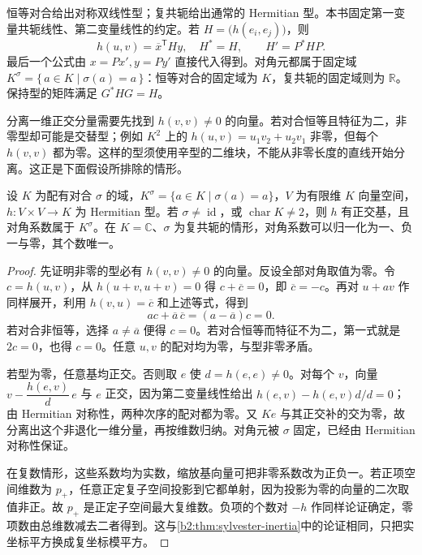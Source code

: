 恒等对合给出对称双线性型；复共轭给出通常的 Hermitian 型。本书固定第一变量共轭线性、第二变量线性的约定。若 \(H=\bigl(h(e_i,e_j)\bigr)\)，则
\[
	h(u,v)=\overline x^{\mathsf T}Hy,\quad H^*=H, \qquad H'=P^*HP.
\]
最后一个公式由 \(x=Px',y=Py'\) 直接代入得到。对角元都属于固定域 \(K^\sigma=\{\,a\in K\mid\sigma(a)=a\,\}\)：恒等对合的固定域为 \(K\)，复共轭的固定域则为 \(\mathbb R\)。保持型的矩阵满足 \(G^*HG=H\)。

\ProseParagraphBreak
分离一维正交分量需要先找到 \(h(v,v)\ne0\) 的向量。若对合恒等且特征为二，非零型却可能是交替型；例如 \(K^2\) 上的 \(h(u,v)=u_1v_2+u_2v_1\) 非零，但每个 \(h(v,v)\) 都为零。这样的型须使用辛型的二维块，不能从非零长度的直线开始分离。这正是下面假设所排除的情形。

\begin{proposition}\label{b2:prop:hermitian-diagonalization}
	设 \(K\) 为配有对合 \(\sigma\) 的域，\(K^\sigma=\{a\in K\mid\sigma(a)=a\}\)，\(V\) 为有限维 \(K\) 向量空间，\(h:V\times V\to K\) 为 Hermitian 型。若 \(\sigma\ne\operatorname{id}\)，或 \(\operatorname{char}K\ne2\)，则 \(h\) 有正交基，且对角系数属于 \(K^\sigma\)。在 \(K=\mathbb C\)、\(\sigma\) 为复共轭的情形，对角系数可以归一化为一、负一与零，其个数唯一。
\end{proposition}
\begin{proof}
	先证明非零的型必有 \(h(v,v)\ne0\) 的向量。反设全部对角取值为零。令 \(c=h(u,v)\)，从 \(h(u+v,u+v)=0\) 得 \(c+\overline c=0\)，即 \(\overline c=-c\)。再对 \(u+av\) 作同样展开，利用 \(h(v,u)=\overline c\) 和上述等式，得到
	\[
		ac+\overline a\,\overline c=(a-\overline a)c=0.
	\]
	若对合非恒等，选择 \(a\ne\overline a\) 便得 \(c=0\)。若对合恒等而特征不为二，第一式就是 \(2c=0\)，也得 \(c=0\)。任意 \(u,v\) 的配对均为零，与型非零矛盾。

	若型为零，任意基均正交。否则取 \(e\) 使 \(d=h(e,e)\ne0\)。对每个 \(v\)，向量 \(v-\dfrac{h(e,v)}d\,e\) 与 \(e\) 正交，因为第二变量线性给出 \(h(e,v)-h(e,v)d/d=0\)；由 Hermitian 对称性，两种次序的配对都为零。又 \(Ke\) 与其正交补的交为零，故分离出这个非退化一维分量，再按维数归纳。对角元被 \(\sigma\) 固定，已经由 Hermitian 对称性保证。

	在复数情形，这些系数均为实数，缩放基向量可把非零系数改为正负一。若正项空间维数为 \(p_+\)，任意正定复子空间投影到它都单射，因为投影为零的向量的二次取值非正。故 \(p_+\) 是正定子空间最大复维数。负项的个数对 \(-h\) 作同样论证确定，零项数由总维数减去二者得到。这与\cref{b2:thm:sylvester-inertia}中的论证相同，只把实坐标平方换成复坐标模平方。
\end{proof}

